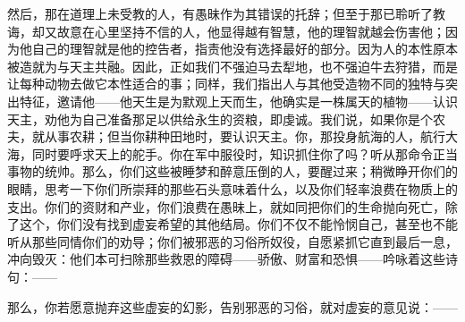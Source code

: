 然后，那在道理上未受教的人，有愚昧作为其错误的托辞；但至于那已聆听了教诲，却又故意在心里坚持不信的人，他显得越有智慧，他的理智就越会伤害他；因为他自己的理智就是他的控告者，指责他没有选择最好的部分。因为人的本性原本被造就为与天主共融。因此，正如我们不强迫马去犁地，也不强迫牛去狩猎，而是让每种动物去做它本性适合的事；同样，我们指出人与其他受造物不同的独特与突出特征，邀请他——他天生是为默观上天而生，他确实是一株属天的植物——认识天主，劝他为自己准备那足以供给永生的资粮，即虔诚。我们说，如果你是个农夫，就从事农耕；但当你耕种田地时，要认识天主。你，那投身航海的人，航行大海，同时要呼求天上的舵手。你在军中服役时，知识抓住你了吗？听从那命令正当事物的统帅。那么，你们这些被睡梦和醉意压倒的人，要醒过来；稍微睁开你们的眼睛，思考一下你们所崇拜的那些石头意味着什么，以及你们轻率浪费在物质上的支出。你们的资财和产业，你们浪费在愚昧上，就如同把你们的生命抛向死亡，除了这个，你们没有找到虚妄希望的其他结局。你们不仅不能怜悯自己，甚至也不能听从那些同情你们的劝导；你们被邪恶的习俗所奴役，自愿紧抓它直到最后一息，冲向毁灭：他们本可扫除那些救恩的障碍——骄傲、财富和恐惧——吟咏着这些诗句：——\par

\par

那么，你若愿意抛弃这些虚妄的幻影，告别邪恶的习俗，就对虚妄的意见说：——\par

\par

